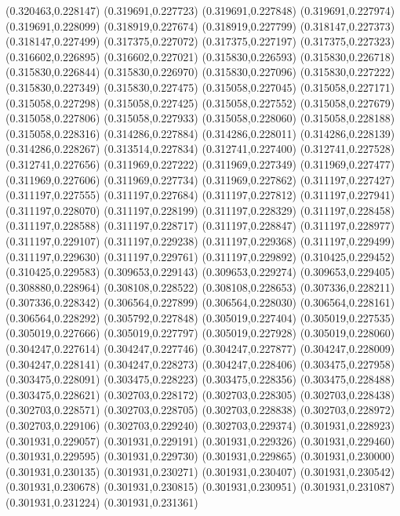 (0.320463,0.228147)
(0.319691,0.227723)
(0.319691,0.227848)
(0.319691,0.227974)
(0.319691,0.228099)
(0.318919,0.227674)
(0.318919,0.227799)
(0.318147,0.227373)
(0.318147,0.227499)
(0.317375,0.227072)
(0.317375,0.227197)
(0.317375,0.227323)
(0.316602,0.226895)
(0.316602,0.227021)
(0.315830,0.226593)
(0.315830,0.226718)
(0.315830,0.226844)
(0.315830,0.226970)
(0.315830,0.227096)
(0.315830,0.227222)
(0.315830,0.227349)
(0.315830,0.227475)
(0.315058,0.227045)
(0.315058,0.227171)
(0.315058,0.227298)
(0.315058,0.227425)
(0.315058,0.227552)
(0.315058,0.227679)
(0.315058,0.227806)
(0.315058,0.227933)
(0.315058,0.228060)
(0.315058,0.228188)
(0.315058,0.228316)
(0.314286,0.227884)
(0.314286,0.228011)
(0.314286,0.228139)
(0.314286,0.228267)
(0.313514,0.227834)
(0.312741,0.227400)
(0.312741,0.227528)
(0.312741,0.227656)
(0.311969,0.227222)
(0.311969,0.227349)
(0.311969,0.227477)
(0.311969,0.227606)
(0.311969,0.227734)
(0.311969,0.227862)
(0.311197,0.227427)
(0.311197,0.227555)
(0.311197,0.227684)
(0.311197,0.227812)
(0.311197,0.227941)
(0.311197,0.228070)
(0.311197,0.228199)
(0.311197,0.228329)
(0.311197,0.228458)
(0.311197,0.228588)
(0.311197,0.228717)
(0.311197,0.228847)
(0.311197,0.228977)
(0.311197,0.229107)
(0.311197,0.229238)
(0.311197,0.229368)
(0.311197,0.229499)
(0.311197,0.229630)
(0.311197,0.229761)
(0.311197,0.229892)
(0.310425,0.229452)
(0.310425,0.229583)
(0.309653,0.229143)
(0.309653,0.229274)
(0.309653,0.229405)
(0.308880,0.228964)
(0.308108,0.228522)
(0.308108,0.228653)
(0.307336,0.228211)
(0.307336,0.228342)
(0.306564,0.227899)
(0.306564,0.228030)
(0.306564,0.228161)
(0.306564,0.228292)
(0.305792,0.227848)
(0.305019,0.227404)
(0.305019,0.227535)
(0.305019,0.227666)
(0.305019,0.227797)
(0.305019,0.227928)
(0.305019,0.228060)
(0.304247,0.227614)
(0.304247,0.227746)
(0.304247,0.227877)
(0.304247,0.228009)
(0.304247,0.228141)
(0.304247,0.228273)
(0.304247,0.228406)
(0.303475,0.227958)
(0.303475,0.228091)
(0.303475,0.228223)
(0.303475,0.228356)
(0.303475,0.228488)
(0.303475,0.228621)
(0.302703,0.228172)
(0.302703,0.228305)
(0.302703,0.228438)
(0.302703,0.228571)
(0.302703,0.228705)
(0.302703,0.228838)
(0.302703,0.228972)
(0.302703,0.229106)
(0.302703,0.229240)
(0.302703,0.229374)
(0.301931,0.228923)
(0.301931,0.229057)
(0.301931,0.229191)
(0.301931,0.229326)
(0.301931,0.229460)
(0.301931,0.229595)
(0.301931,0.229730)
(0.301931,0.229865)
(0.301931,0.230000)
(0.301931,0.230135)
(0.301931,0.230271)
(0.301931,0.230407)
(0.301931,0.230542)
(0.301931,0.230678)
(0.301931,0.230815)
(0.301931,0.230951)
(0.301931,0.231087)
(0.301931,0.231224)
(0.301931,0.231361)
